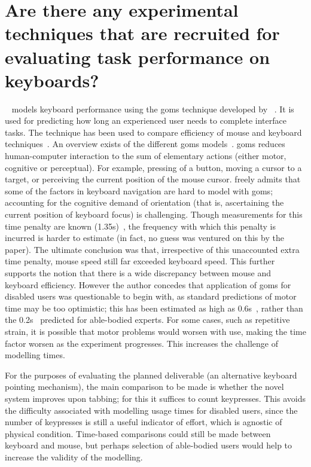 \documentclass[11pt,openright,a4paper]{report}
\begin{document}
\section{Are there any experimental techniques that are recruited for evaluating task performance on keyboards?}
\citeauthor{schrepp2006efficiency}~\cite{schrepp2006efficiency} models keyboard performance using the \gls{goms} technique developed by \citeauthor{card1983psychology}~\cite{card1983psychology}. It is used for predicting how long an experienced user needs to complete interface tasks. The technique has been used to compare efficiency of mouse and keyboard techniques~\cite{card1983psychology,john1996goms}. An overview exists of the different \gls{goms} models~\cite{john1995goms}. \gls{goms} reduces human-computer interaction to the sum of elementary actions (either motor, cognitive or perceptual). For example, pressing of a button, moving a cursor to a target, or perceiving the current position of the mouse cursor. \citeauthor{schrepp2006efficiency} freely admits that some of the factors in keyboard navigation are hard to model with \gls{goms}; accounting for the cognitive demand of orientation (that is, ascertaining the current position of keyboard focus) is challenging. Though measurements for this time penalty are known (1.35s)~\cite{raskin2000humane}, the frequency with which this penalty is incurred is harder to estimate (in fact, no guess was ventured on this by the paper). The ultimate conclusion was that, irrespective of this unaccounted extra time penalty, mouse speed still far exceeded keyboard speed. This further supports the notion that there is a wide discrepancy between mouse and keyboard efficiency. However the author concedes that application of \gls{goms} for disabled users was questionable to begin with, as standard predictions of motor time may be too optimistic; this has been estimated as high as 0.6s~\cite{keates1998developing}, rather than the 0.2s~\cite{raskin2000humane} predicted for able-bodied experts. For some cases, such as repetitive strain, it is possible that motor problems would worsen with use, making the time factor worsen as the experiment progresses. This increases the challenge of modelling times.

For the purposes of evaluating the planned deliverable (an alternative keyboard pointing mechanism), the main comparison to be made is whether the novel system improves upon tabbing; for this it suffices to count keypresses. This avoids the difficulty associated with modelling usage times for disabled users, since the number of keypresses is still a useful indicator of effort, which is agnostic of physical condition. Time-based comparisons could still be made between keyboard and mouse, but perhaps selection of able-bodied users would help to increase the validity of the modelling.
\end{document}
